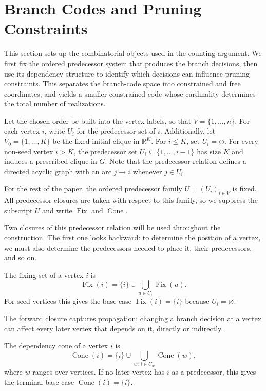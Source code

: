 \section{Branch Codes and Pruning Constraints}
\label{sec:subproblems}

This section sets up the combinatorial objects used in the counting argument. We first fix the ordered predecessor system that produces the branch decisions, then use its dependency structure to identify which decisions can influence pruning constraints. This separates the branch-code space into constrained and free coordinates, and yields a smaller constrained code whose cardinality determines the total number of realizations.

Let the chosen order be built into the vertex labels, so that $V=\{1,\ldots,n\}$. For each vertex $i$, write $U_i$ for the predecessor set of $i$. Additionally, let $V_0=\{1,\ldots,K\}$ be the fixed initial clique in $\mathbb{R}^K$. For $i\le K$, set $U_i=\varnothing$. For every non-seed vertex $i > K$, the predecessor set $U_i \subseteq \{1,\ldots,i-1\}$ has size $K$ and induces a prescribed clique in $G$. Note that the predecessor relation defines a directed acyclic graph with an arc $j \to i$ whenever $j \in U_i$.

For the rest of the paper, the ordered predecessor family $U=(U_i)_{i\in V}$ is fixed. All predecessor closures are taken with respect to this family, so we suppress the subscript $U$ and write $\operatorname{Fix}$ and $\operatorname{Cone}$.

Two closures of this predecessor relation will be used throughout the construction. The first one looks backward: to determine the position of a vertex, we must also determine the predecessors needed to place it, their predecessors, and so on.

\begin{definition}
\label{def:fixing}
The fixing set of a vertex $i$ is
\[
\operatorname{Fix}(i)
=
\{i\}\cup \bigcup_{u\in U_i}\operatorname{Fix}(u).
\]
For seed vertices this gives the base case $\operatorname{Fix}(i)=\{i\}$ because $U_i=\varnothing$.
\end{definition}

The forward closure captures propagation: changing a branch decision at a vertex can affect every later vertex that depends on it, directly or indirectly.

\begin{definition}
\label{def:cone}
The dependency cone of a vertex $i$ is
\[
\operatorname{Cone}(i)
=
\{i\}\cup \bigcup_{w:\,i\in U_w}\operatorname{Cone}(w),
\]
where $w$ ranges over vertices. If no later vertex has $i$ as a predecessor, this gives the terminal base case $\operatorname{Cone}(i)=\{i\}$.
\end{definition}

